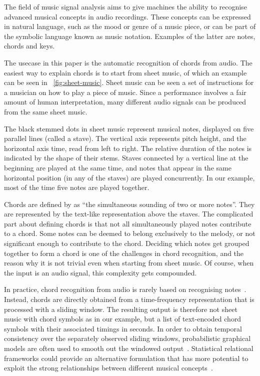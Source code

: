 \documentclass[letterpaper]{article} %
\newcommand{\figref}[1]{\figurename~\ref{fig:#1}} %
\begin{document}
The field of music signal analysis aims to give machines the ability to recognise advanced musical concepts in audio recordings. These concepts can be expressed in natural language, such as the mood or genre of a music piece, or can be part of the symbolic language known as music notation.
Examples of the latter are notes, chords and keys.

The usecase in this paper is the automatic recognition of chords from audio. The easiest way to explain chords is to start from sheet music, of which an example can be seen in \figref{sheet-music}. Sheet music can be seen a set of instructions for a musician on how to play a piece of music.
Since a performance involves a fair amount of human interpretation, many different audio signals can be produced from the same sheet music.

The black stemmed dots in sheet music represent musical notes, displayed on five parallel lines (called a stave). The vertical axis represents pitch height, and the horizontal axis time, read from left to right. The relative duration of the notes is indicated by the shape of their stems. Staves connected by a vertical line at the beginning are played at the same time, and notes that appear in the same horizontal position (in any of the staves) are played concurrently. In our example, most of the time five notes are played together.

Chords are defined by \citeauthor{grovemusic} as ``the simultaneous sounding of two or more notes''. They are represented by the text-like representation above the staves. The complicated part about defining chords is that not all simultaneously played notes contribute to a chord. Some notes can be deemed to belong exclusively to the melody, or not significant enough to contribute to the chord. Deciding which notes get grouped together to form a chord is one of the challenges in chord recognition, and the reason why it is not trivial even when starting from sheet music. Of course, when the input is an audio signal, this complexity gets compounded.

In practice, chord recognition from audio is rarely based on recognising notes~\cite{pauwels2019ismir}. Instead, chords are directly obtained from a time-frequency representation that is processed with a sliding window. The resulting output is therefore not sheet music with chord symbols as in our example, but a list of text-encoded chord symbols with their associated timings in seconds. In order to obtain temporal consistency over the separately observed sliding windows, probabilistic graphical models are often used to smooth out the windowed output~\cite{pauwels2019ismir}. Statistical relational frameworks could provide an alternative formulation that has more potential to exploit the strong relationships between different musical concepts~\cite{papadopoulos2017taslp}.
\end{document}
